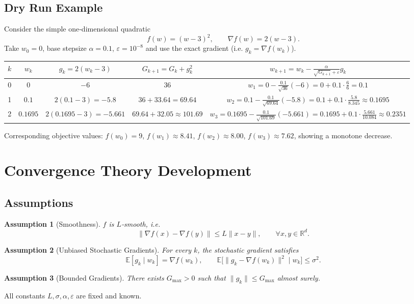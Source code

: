 \documentclass{article}
\newtheorem{assumption}{Assumption}
\newcommand{\E}{\mathbb{E}}
\newcommand{\R}{\mathbb{R}}
\begin{document}
\subsection*{Dry Run Example}
Consider the simple one‑dimensional quadratic 
\[
f(w)=(w-3)^{2},\qquad \nabla f(w)=2(w-3).
\]
Take $w_{0}=0$, base stepsize $\alpha=0.1$, $\varepsilon=10^{-8}$ and use the
exact gradient (i.e. $g_{k}=\nabla f(w_{k})$).  

\begin{center}
\begin{tabular}{c|c|c|c|c}
$k$ & $w_{k}$ & $g_{k}=2(w_{k}-3)$ & $G_{k+1}=G_{k}+g_{k}^{2}$ & $w_{k+1}=w_{k}-\frac{\alpha}{\sqrt{G_{k+1}}+\varepsilon}g_{k}$\\ \hline
0 & $0$ & $-6$ & $36$ & $w_{1}=0-\frac{0.1}{\sqrt{36}}(-6)=0+0.1\cdot\frac{6}{6}=0.1$\\[4pt]
1 & $0.1$ & $2(0.1-3)=-5.8$ & $36+33.64=69.64$ & $w_{2}=0.1-\frac{0.1}{\sqrt{69.64}}(-5.8)
      =0.1+0.1\cdot\frac{5.8}{8.345}\approx0.1695$\\[4pt]
2 & $0.1695$ & $2(0.1695-3)=-5.661$ & $69.64+32.05\approx101.69$ &
 $w_{3}=0.1695-\frac{0.1}{\sqrt{101.69}}(-5.661)
      =0.1695+0.1\cdot\frac{5.661}{10.084}\approx0.2351$\\
\end{tabular}
\end{center}
Corresponding objective values: $f(w_{0})=9$, $f(w_{1})\approx8.41$,
$f(w_{2})\approx8.00$, $f(w_{3})\approx7.62$, showing a monotone decrease.

\section*{Convergence Theory Development}

\subsection*{Assumptions}
\begin{assumption}[Smoothness]
$f$ is $L$‑smooth, i.e.
\[
\|\nabla f(x)-\nabla f(y)\|\le L\|x-y\|,\qquad\forall x,y\in\R^{d}.
\] \label{as:smooth}
\end{assumption}
\begin{assumption}[Unbiased Stochastic Gradients]
For every $k$, the stochastic gradient satisfies
\[
\E[g_{k}\mid w_{k}] = \nabla f(w_{k}), \qquad 
\E\bigl[\|g_{k}-\nabla f(w_{k})\|^{2}\mid w_{k}\bigr]\le\sigma^{2}.
\] \label{as:unbiased}
\end{assumption}
\begin{assumption}[Bounded Gradients]
There exists $G_{\max}>0$ such that $\|g_{k}\|\le G_{\max}$ almost surely.
\label{as:bounded}
\end{assumption}
All constants $L,\sigma,\alpha,\varepsilon$ are fixed and known.
\end{document}
